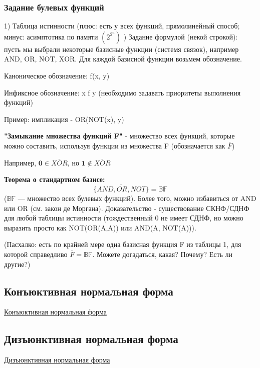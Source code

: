 \documentclass{article}
\begin{document}
\subsubsection{Задание булевых функций}
1) Таблица истинности (плюс: есть у всех функций, прямолинейный способ; минус: асимптотика по памяти $(2^{2^{n}})$ ) Задание формулой (некой строкой): пусть мы выбрали некоторые базисные функции (системя связок), например AND, OR, NOT, XOR. Для каждой базисной функции возьмем обозначение.

Каноническое обозначение: 
f(x, y)

Инфиксное обозначение:
x f y (необходимо задавать приоритеты выполнения функций)

Пример: импликация - OR(NOT(x), y)

\textbf{"Замыкание множества функций F"} - множество всех функций, которые можно составить, используя функции из множества F (обозначается как $\overline{F}$)

Например, $\textbf{0} \in \overline{XOR}$, но $\textbf{1} \notin \overline{XOR}$

\textbf{Теорема о стандартном базисе:} 
\[ \overline{\{AND, OR, NOT\}} = \mathbb{BF} \] ($\mathbb{BF}$ --- множество всех булевых функций). Более того, можно избавиться от AND или OR (см. закон де Моргана). Доказательство - существование СКНФ/СДНФ для любой таблицы истинности (тождественный 0 не имеет СДНФ, но можно выразить просто как NOT(OR(A,A)) или AND(A, NOT(A))). 


(Пасхалко: есть по крайней мере одна базисная функция F из таблицы 1, для которой справедливо $ \overline{F} = \mathbb{BF} $. Можете догадаться, какая? Почему? Есть ли другие?) 

\subsection{Конъюктивная нормальная форма}
\href{https://ru.wikipedia.org/wiki/%D0%9A%D0%BE%D0%BD%D1%8A%D1%8E%D0%BD%D0%BA%D1%82%D0%B8%D0%B2%D0%BD%D0%B0%D1%8F_%D0%BD%D0%BE%D1%80%D0%BC%D0%B0%D0%BB%D1%8C%D0%BD%D0%B0%D1%8F_%D1%84%D0%BE%D1%80%D0%BC%D0%B0}{Конъюктивная нормальная форма}

\subsection{Дизъюнктивная нормальная форма}
\href{https://ru.wikipedia.org/wiki/%D0%94%D0%B8%D0%B7%D1%8A%D1%8E%D0%BD%D0%BA%D1%82%D0%B8%D0%B2%D0%BD%D0%B0%D1%8F_%D0%BD%D0%BE%D1%80%D0%BC%D0%B0%D0%BB%D1%8C%D0%BD%D0%B0%D1%8F_%D1%84%D0%BE%D1%80%D0%BC%D0%B0}{Дизъюнктивная нормальная форма}
\end{document}
